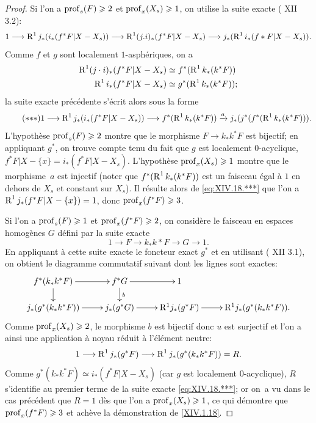 \begin{proof}
Si l'on a $\operatorname{prof}_s(F)\geqslant 2$ et $\operatorname{prof}_x(X_s)\geqslant 1$, on utilise la suite exacte ( XII 3.2):
$$1\to\R^1j_*(i_*(f^*F{|X-X_s}))\to\R^1(j.i)_*(f^*F{|X-X_s}) \to j_*(\R^1i_*(f*F{|X-X_s})).
$$
Comme $f$ et $g$ sont localement $1$-asph\'eriques, on a
\begin{align*}
\operatorname{R}^1(j\cdot i)_*(f^*F{|X-X_s})&\simeq f^*(\operatorname{R}^1k_*(k^*F)) \\
\operatorname{R}^1i_*(f^*F{|X-X_s})&\simeq g^*(\operatorname{R}^1k_*(k^*F));
\end{align*}
la suite exacte pr\'ec\'edente s'\'ecrit alors sous la forme
\enlargethispage{\baselineskip}%
\begin{equation} \label{eq:XIV.18.***}\tag{${*}{*}{*}$}
1\to\R^1j_*(i_*(f^*F{|X-X_s}))\to f^*(\R^1k_*(k^*F))\lto{a} j_*(j^*(f^*(\R^1k_*(k^*F))).
\end{equation}
L'hypoth\`ese $\operatorname{prof}_s(F)\geqslant 2$ montre que le morphisme $F\to k_*k^*F$ est bijectif; en appliquant $g^*$, on trouve compte tenu du fait que $g$ est localement $0$-acyclique, $f^*F{|X-\{x\}}=i_*(f^*F{|X-X_s})$. L'hypoth\`ese $\operatorname{prof}_x(X_s)\geqslant 1$ montre que le morphisme~$a$ est injectif (noter que $f^*(\operatorname{R}^1k_*(k^*F))$ est un faisceau \'egal \`a $1$ en dehors de $X_s$ et constant sur $X_s$). Il r\'esulte alors de \eqref{eq:XIV.18.***} que l'on a $\operatorname{R}^1j_*(f^*F{|X-\{x\}})=1$, donc $\operatorname{prof}_x(f^*F)\geqslant 3$.

\enlargethispage{.8\baselineskip}%
Si l'on a $\operatorname{prof}_s(F)\geqslant 1$ et $\operatorname{prof}_x(f^*F)\geqslant 2$, on consid\`ere le faisceau en espaces homog\`enes $G$ d\'efini par la suite exacte
$$
1\to F\to k_*k*F\to G\to 1.
$$
En appliquant \`a cette suite exacte le foncteur exact $g^*$ et en utilisant ( XII 3.1), on obtient le diagramme commutatif suivant dont les lignes sont exactes:
$$
\xymatrix@R=5mm{{f^*(k_*k^*F)}\ar[r]\ar[d]&{f^*G}\ar[r]\ar[d]^b&1\\
{j_*(g^*(k_*k^*F))}\ar[r]&{j_*(g^*G)}\ar[r]&{\mathrm{R}^1j_*(g^*F)} \ar[r]&{\mathrm{R}^1j_*(g^*(k_*k^*F)).}}
$$
Comme $\operatorname{prof}_x(X_s)\geqslant 2$, le morphisme $b$ est bijectif donc $u$ est surjectif et l'on a ainsi une application \`a noyau r\'eduit \`a l'\'el\'ement neutre:
$$
1\to\R^1j_*(g^*F)\to\R^1j_*(g^*(k_*k^*F))=R.
$$
Comme $g^*(k_*k^*F)\simeq i_*(f^*F{|X-X_s})$ (car $g$ est localement $0$-acyclique), $R$ s'identifie au premier terme de la suite exacte \eqref{eq:XIV.18.***}; or on~a vu dans le cas pr\'ec\'edent que $R=1$ d\`es que l'on a $\operatorname{prof}_x(X_s)\geqslant 1$, ce qui d\'emontre que $\operatorname{prof}_x(f^*F)\geqslant 3$ et ach\`eve la d\'emonstration de \ref{XIV.1.18}.
\skipqed
\end{proof}

